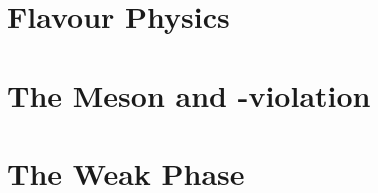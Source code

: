\section{Flavour Physics}
\label{Flavour_Physics}


\section{The \Bs Meson and \CP-violation}
\label{Phenomenology}


\section{The Weak Phase \phis}
\label{WeakPhase}


